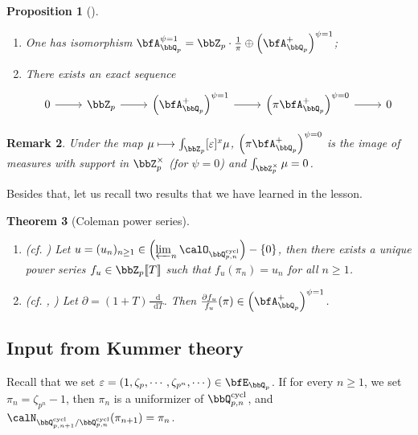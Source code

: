 \documentclass[a4paper,oneside]{amsart}
\DeclareMathOperator{\cycl}{cycl}
\newcommand*\dif{\mathop{}\!\mathrm{d}}
\newtheorem{theorem}{Theorem}[section]
\newtheorem{remark}[theorem]{Remark}
\newtheorem{proposition}[theorem]{Proposition}
\numberwithin{equation}{section}
\begin{document}
\begin{proposition}[{\cite[Proposition 7.1.1]{colmez_fontaines_nodate}}]\leavevmode
    \begin{enumerate}
        \item One has isomorphism $\bfA_{\bbQ_p}^{\psi=1}=\bbZ_p\cdot \frac{1}{\pi}\oplus \left(\bfA_{\bbQ_p}^+\right)^{\psi=1}$;
        \item There exists an exact sequence
              $$\begin{tikzcd}
                      0\ar[r]&\bbZ_p\ar[r]&\left(\bfA_{\bbQ_p}^+\right)^{\psi=1}\ar[r]&\left(\pi\bfA_{\bbQ_p}^+\right)^{\psi=0}\ar[r]&0
                  \end{tikzcd}$$
    \end{enumerate}
\end{proposition}

\begin{remark}
    Under the map $\mu\longmapsto\int_{\bbZ_p}[\varepsilon]^x\mu$, $\left(\pi\bfA_{\bbQ_p}^+\right)^{\psi=0}$ is the image of measures with support in $\bbZ_p^\times$ (for $\psi=0$) and $\int_{\bbZ_p^\times}\mu=0$.
\end{remark}

Besides that, let us recall two results that we have learned in the lesson.
\begin{theorem}[Coleman power series]\leavevmode\begin{enumerate}
        \item (cf. \cite[Theorem 2.1.2]{coates_cyclotomic_2006}) Let $u=(u_n)_{n\geq 1}\in\left(\varprojlim_n \calO_{\bbQ_{p,n}^{\cycl}}\right)-\{0\}$, then there exists a unique power series $f_u\in\bbZ_p\llbracket T\rrbracket$ such that $f_u(\pi_n)=u_n$ for all $n\geq 1$.
        \item (cf. \cite[Lemma 2.4.5]{coates_cyclotomic_2006}, ) Let $\partial=(1+T)\frac{\dif}{\dif T}$. Then $\frac{\partial f_u}{f_u}(\pi)\in\left(\bfA_{\bbQ_p}^+\right)^{\psi=1}$.
    \end{enumerate}

\end{theorem}
\subsection{Input from Kummer theory}
Recall that we set $\varepsilon=(1,\zeta_p,\cdots,\zeta_{p^n},\cdots)\in\bfE_{\bbQ_p}$. If for every $n\geq 1$, we set $\pi_n=\zeta_{p^n}-1$, then $\pi_n$ is a uniformizer of $\bbQ_{p,n}^{\cycl}$, and $\calN_{\bbQ_{p,n+1}^{\cycl}/\bbQ_{p,n}^{\cycl}}(\pi_{n+1})=\pi_n$.
\end{document}

